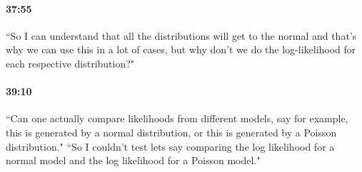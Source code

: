 \documentclass[11pt]{article}
\begin{document}
\paragraph{37:55}  ``So I can understand that all the distributions will get to the normal and that's why we can use this in a lot of cases, but why don't we do the log-likelihood for each respective distribution?"
\paragraph{39:10} ``Can one actually compare likelihoods from different models, say for example, this is generated by a normal distribution, or this is generated by a Poisson distribution."  ``So I couldn't test lets say comparing the log likelihood for a normal model and the log likelihood for a Poisson model."
\end{document}
